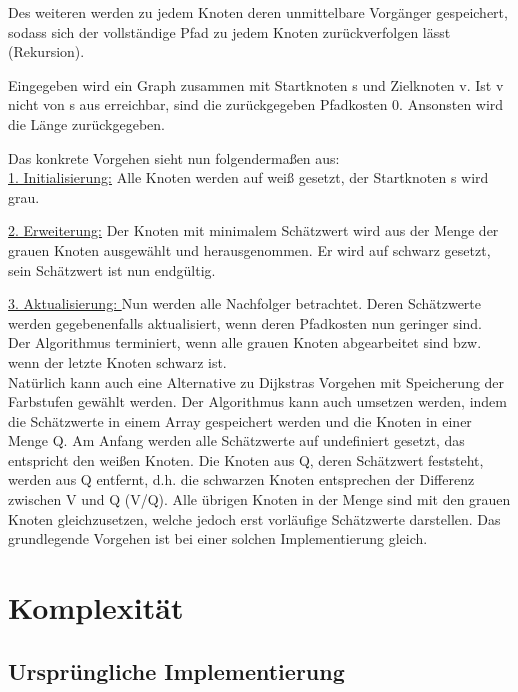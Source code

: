 \parindent0pt Des weiteren werden zu jedem Knoten deren unmittelbare Vorgänger gespeichert, sodass sich der vollständige Pfad zu jedem Knoten zurückverfolgen lässt (Rekursion).

\parindent0pt Eingegeben wird ein Graph zusammen mit Startknoten s und Zielknoten v. Ist v nicht von s aus erreichbar, sind die zurückgegeben Pfadkosten 0. Ansonsten wird die Länge zurückgegeben.

\parindent0pt Das konkrete Vorgehen sieht nun folgendermaßen aus: \\

\parindent0pt \underline{1. Initialisierung:} Alle Knoten werden auf weiß gesetzt, der Startknoten s wird grau.

\parindent0pt \underline{2. Erweiterung:} Der Knoten mit minimalem Schätzwert wird aus der Menge der grauen Knoten ausgewählt und herausgenommen. Er wird auf schwarz gesetzt, sein Schätzwert ist nun endgültig.

\parindent0pt \underline{3. Aktualisierung: }Nun werden alle Nachfolger betrachtet. Deren Schätzwerte werden gegebenenfalls aktualisiert, wenn deren Pfadkosten nun geringer sind. \\ 

\parindent0pt Der Algorithmus terminiert, wenn alle grauen Knoten abgearbeitet sind bzw. wenn der letzte Knoten schwarz ist. \\

Natürlich kann auch eine Alternative zu Dijkstras Vorgehen mit Speicherung der Farbstufen gewählt werden. Der Algorithmus kann auch umsetzen werden, indem die Schätzwerte in einem Array gespeichert werden und die Knoten in einer Menge Q. Am Anfang werden alle Schätzwerte auf undefiniert gesetzt, das entspricht den weißen Knoten. Die Knoten aus Q, deren Schätzwert feststeht, werden aus Q entfernt, d.h. die schwarzen Knoten entsprechen der Differenz zwischen V und Q (V/Q). Alle übrigen Knoten in der Menge sind mit den grauen Knoten gleichzusetzen, welche jedoch erst vorläufige Schätzwerte darstellen. Das grundlegende Vorgehen ist bei einer solchen Implementierung gleich. 



\section{Komplexität}

\subsection{Ursprüngliche Implementierung}

